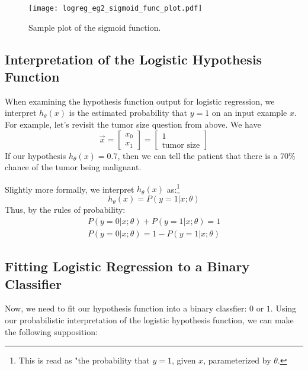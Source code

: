 \begin{figure}[h] %
	\centering
	\graphicspath{{./Figures/}} %
	\texttt{[image: logreg\_eg2\_sigmoid\_func\_plot.pdf]} 
	\caption[]{Sample plot of the sigmoid function.}
	\label{logreg_eg2_sigmoid_func_plot.pdf}
\end{figure}


\subsection{Interpretation of the Logistic Hypothesis Function}

When examining the hypothesis function output for logistic regression, we interpret $h_\theta\left(x \right)$ is the estimated probability that $y=1$ on an input example $x$. For example, let's revisit the tumor size question from above. We have 
$$
\vec{x} = \left[\begin{array}{c}x_0 \\ x_1 \end{array}\right] = \left[\begin{array}{c}1 \\ \text{tumor size} \end{array}\right]
$$
If our hypothesis $h_\theta\left( x \right) = 0.7$, then we can tell the patient that there is a 70\% chance of the tumor being malignant. 

Slightly more formally, we interpret $h_\theta\left(x\right)$ as:\footnote{This is read as "the probability that $y = 1$, given $x$, parameterized by $\theta$.}
\begin{equation}
h_\theta\left(x\right) = P\left(y=1 | x; \theta\right)
\end{equation}
Thus, by the rules of probability:
\begin{align}
P\left(y=0 | x; \theta\right) + P\left(y=1 | x; \theta\right) = 1 \\
P\left(y=0 | x; \theta\right) = 1 - P\left(y=1 | x; \theta\right)
\end{align}


\subsection{Fitting Logistic Regression to a Binary Classifier}
\label{chaplogreg-sect-hyporeg-subsectbinclasfit}
Now, we need to fit our hypothesis function into a binary classfier: $0$ or $1$. Using our probabilistic interpretation of the logistic hypothesis function, we can make the following supposition:


